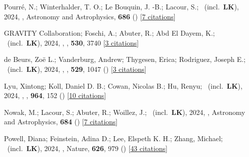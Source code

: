 \item[{\color{numcolor}\scriptsize108}] Pourr{\'e}, N.; Winterhalder, T. O.; Le Bouquin, J. -B.; Lacour, S.; \etal\ (incl.\ \textbf{LK}), 2024, , Astronomy and Astrophysics, \textbf{686} () [\href{https://ui.adsabs.harvard.edu/abs/2024A&A...686A.258P}{7 citations}]

\item[{\color{numcolor}\scriptsize107}] GRAVITY Collaboration; Foschi, A.; Abuter, R.; Abd El Dayem, K.; \etal\ (incl.\ \textbf{LK}), 2024, , \mnras, \textbf{530}, 3740 [\href{https://ui.adsabs.harvard.edu/abs/2024MNRAS.530.3740G}{3 citations}]

\item[{\color{numcolor}\scriptsize106}] de Beurs, Zo{\"e} L.; Vanderburg, Andrew; Thygesen, Erica; Rodriguez, Joseph E.; \etal\ (incl.\ \textbf{LK}), 2024, , \mnras, \textbf{529}, 1047 () [\href{https://ui.adsabs.harvard.edu/abs/2024MNRAS.529.1047D}{3 citations}]

\item[{\color{numcolor}\scriptsize105}] Lyu, Xintong; Koll, Daniel D. B.; Cowan, Nicolas B.; Hu, Renyu; \etal\ (incl.\ \textbf{LK}), 2024, , \apj, \textbf{964}, 152 () [\href{https://ui.adsabs.harvard.edu/abs/2024ApJ...964..152L}{10 citations}]

\item[{\color{numcolor}\scriptsize104}] Nowak, M.; Lacour, S.; Abuter, R.; Woillez, J.; \etal\ (incl.\ \textbf{LK}), 2024, , Astronomy and Astrophysics, \textbf{684} () [\href{https://ui.adsabs.harvard.edu/abs/2024A&A...684A.184N}{7 citations}]

\item[{\color{numcolor}\scriptsize103}] Powell, Diana; Feinstein, Adina D.; Lee, Elspeth K. H.; Zhang, Michael; \etal\ (incl.\ \textbf{LK}), 2024, , Nature, \textbf{626}, 979 () [\href{https://ui.adsabs.harvard.edu/abs/2024Natur.626..979P}{43 citations}]

